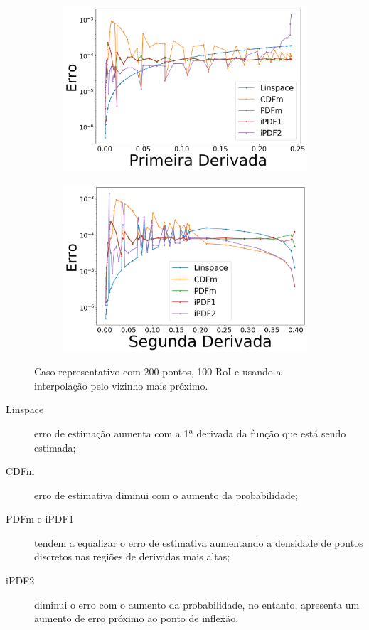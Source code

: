 \begin{figure}[H]
	\begin{subfigure}[b]{0.45\textwidth}
		\centering 
		\includegraphics[width=\textwidth]{./figuras/error_normal_nearest_Primeira_Derivada.png}
		\caption{}
		\label{fig:12c}
	\end{subfigure}
	\hfill
	\begin{subfigure}[b]{0.45\textwidth}
		\centering 
		\includegraphics[width=\textwidth]{./figuras/error_normal_nearest_Segunda_Derivada.png}
		\caption{}
		\label{fig:12d}
	\end{subfigure}
	\caption{Caso representativo com 200 pontos, 100 \ac{RoI} e usando a interpolação pelo vizinho mais próximo.}
	\label{fig:12}
\end{figure}

\begin{description}
	\item[Linspace] erro de estimação aumenta com a 1ª derivada da função que está sendo estimada;
	\item[CDFm] erro de estimativa diminui com o aumento da probabilidade; 
	\item[PDFm e iPDF1] tendem a equalizar o erro de estimativa aumentando a densidade de pontos discretos nas regiões de derivadas mais altas; 
	\item[iPDF2] diminui o erro com o aumento da probabilidade, no entanto, apresenta um aumento de erro próximo ao ponto de inflexão.
\end{description}  

